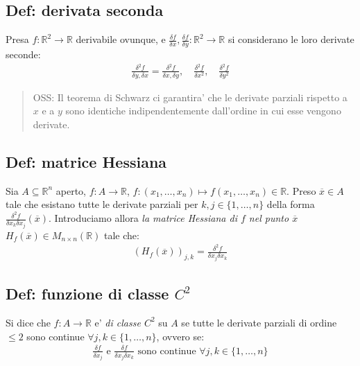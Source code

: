 \documentclass{article}
\begin{document}

\subsection{Def: derivata seconda}

Presa $f: \mathbb{R}^2 \to \mathbb{R}$ derivabile ovunque, e $\frac{\delta f}{\delta x},
\frac{\delta f}{\delta y}: \mathbb{R}^2 \to \mathbb{R}$ si considerano le loro
derivate seconde:
\begin{align*}
  \frac{\delta^2 f}{\delta y, \delta x} = \frac{\delta^2 f}{\delta x, \delta y}, \quad
  \frac{\delta^2 f}{\delta x^2}, \quad \frac{\delta^2 f}{\delta y^2}
\end{align*}

\begin{quote}
  OSS: Il teorema di Schwarz ci garantira' che le derivate parziali rispetto
  a $x$ e a $y$ sono identiche indipendentemente dall'ordine in cui esse vengono derivate.
\end{quote}

\subsection{Def: matrice Hessiana}

Sia $A \subseteq \mathbb{R}^n$ aperto, $f: A \to \mathbb{R}$, $f: (x_1, \ldots, x_n)
\mapsto f(x_1, \ldots, x_n) \in \mathbb{R}$. Preso $\overline{x} \in A$ tale che
esistano tutte le derivate parziali per $k,j \in \{1, \ldots, n\}$ della forma
$\frac{\delta^2 f}{\delta x_k \delta x_j}(\overline{x})$. Introduciamo allora
\emph{la matrice Hessiana di $f$ nel punto $\overline{x}$} $H_f(\overline{x}) \in
M_{n \times n} (\mathbb{R})$ tale che:
\begin{align*}
  (H_f(\overline{x}))_{j,k} = \frac{\delta^2 f}{\delta x_j \delta x_k}
\end{align*}

\subsection{Def: funzione di classe $C^2$}

Si dice che $f: A \to \mathbb{R}$ e' \emph{di classe $C^2$} su $A$ se tutte le
derivate parziali di ordine $\leq 2$ sono continue $\forall j, k \in \{1,\ldots,n\}$,
ovvero se:
\begin{align*}
  \frac{\delta f}{\delta x_j} \text{ e } \frac{\delta f}{\delta x_j \delta x_k}
  \text{ sono continue } \forall j, k \in \{1,\ldots,n\}
\end{align*}
\end{document}
